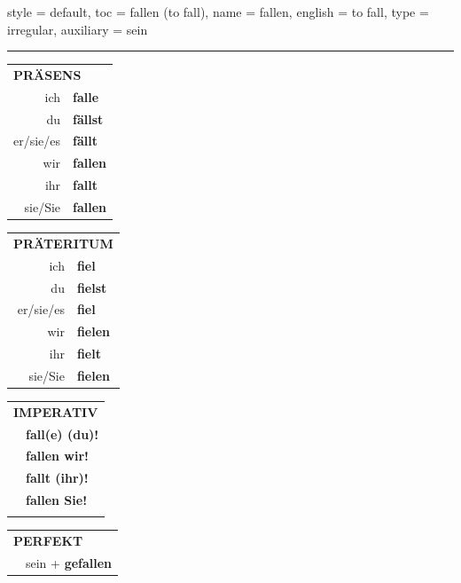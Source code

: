 \begin{verbentry}{
  style = {default},
  toc = {fallen (to fall)},
  name = {fallen},
  english = {to fall},
  type = {irregular},
  auxiliary = {sein}
}
 
    
     \vspace{5pt}

    \hrule
    
    \vspace{5pt}

  \begin{tabular}{rl}
     \multicolumn{2}{l}{\textbf{PRÄSENS} }\\
    ich & \textbf{falle}\\
    du & \textbf{fällst}\\
    er/sie/es & \textbf{fällt}\\
    wir & \textbf{fallen}\\
    ihr & \textbf{fallt}\\
    sie/Sie & \textbf{fallen}\\
  \end{tabular}
  \hfill
     \begin{tabular}{rl}
    \multicolumn{2}{l}{\textbf{PRÄTERITUM} }\\
    ich & \textbf{fiel}\\
    du & \textbf{fielst}\\
    er/sie/es & \textbf{fiel}\\
    wir & \textbf{fielen}\\
    ihr & \textbf{fielt}\\
    sie/Sie & \textbf{fielen}\\
  \end{tabular}
  \hfill
  \begin{tabular}{rl}
     \multicolumn{2}{l}{\textbf{IMPERATIV} }\\
   & \textbf{fall(e) (du)!}\\
   & \textbf{fallen wir!}\\
   & \textbf{fallt (ihr)!}\\
   & \textbf{fallen Sie!}\\
   & \vspace{10pt}
  \end{tabular}

    \vspace{10pt}

 \begin{tabular}{rl}
     \multicolumn{2}{l}{\textbf{PERFEKT}}\\
    & sein + \textbf{gefallen}\\
  \end{tabular}
\hfill
   \begin{tabular}{rl}
   

\end{tabular}
\end{verbentry}

